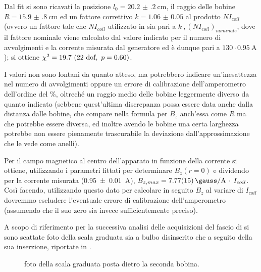 	Dal fit si sono ricavati la posizione $l_0 = \SI{20.2(2)}{\cm} $, il raggio
	delle bobine $R = \SI{15.9(8)}{\cm}$ ed un fattore correttivo $k = \num{1.06(5)}$
	al prodotto $N I_{coil}$ (ovvero un fattore tale che $N I_{coil}$ utilizzato in 
	sia pari a $k\ , (N I_{coil})_{nominale}$, dove il fattore nominale viene calcolato dal valore
	indicato per il numero di avvolgimenti e la corrente misurata dal generatore ed è dunque
	pari a $130 \cdot  \SI{0.95}{\A}$);
	si ottiene $\chi^2 = 19.7 \ (22 \text{ dof} , \  p = 0.60)$.

	I valori non sono lontani da quanto atteso, ma potrebbero indicare un'inesattezza
	nel numero di avvolgimenti oppure un errore di calibrazione dell'amperometro dell'ordine del \%,
	oltreché un raggio medio delle bobine leggermente diverso da quanto indicato
	(sebbene quest'ultima discrepanza possa essere data anche dalla distanza dalle bobine, che compare nella
	formula per $B_z$ anch'essa come $R$ ma che potrebbe essere diversa, ed inoltre avendo le bobine
	una certa larghezza potrebbe non essere pienamente trascurabile la deviazione
	dall'approssimazione che le vede come anelli).

	Per il campo magnetico al centro dell'apparato in funzione della corrente si ottiene,
	utilizzando i parametri fittati per determinare $B_z(r=0)$ e dividendo per la corrente
	misurata (\SI{0.95(1)}{\A}), $B_{z,max} = \SI{7.77(15)}{\gauss\per\A} \, \cdot \, I_{coil}$.
	Così facendo, utilizzando questo dato per calcolare in seguito $B_z$ al variare di $I_{coil}$
	dovremmo escludere l'eventuale errore di calibrazione dell'amperometro
	(assumendo che il suo zero sia invece sufficientemente preciso).

	A scopo di riferimento per la successiva analisi delle acquisizioni
	del fascio di \e si sono scattate foto della scala graduata sia
	a bulbo disinserito che a seguito della sua inserzione, riportate in .

	\begin{figure}[hb]
		\centering
		\caption{foto della scala graduata posta dietro la seconda bobina.}
		\label{fig:scala}
	\end{figure}



